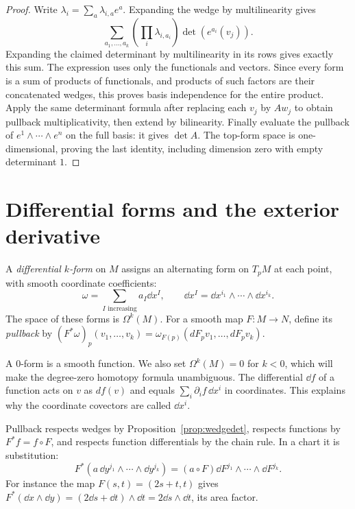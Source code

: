 \begin{proof}
Write $\lambda_i=\sum_a\lambda_{i,a}e^a$. Expanding the wedge by multilinearity gives
\[
\sum_{a_1,\ldots,a_k}\left(\prod_i\lambda_{i,a_i}\right)
\det(e^{a_i}(v_j)).
\]
Expanding the claimed determinant by multilinearity in its rows gives exactly this sum. The expression uses only the functionals and vectors. Since every form is a sum of products of functionals, and products of such factors are their concatenated wedges, this proves basis independence for the entire product. Apply the same determinant formula after replacing each $v_j$ by $Aw_j$ to obtain pullback multiplicativity, then extend by bilinearity. Finally evaluate the pullback of $e^1\wedge\cdots\wedge e^n$ on the full basis: it gives $\det A$. The top-form space is one-dimensional, proving the last identity, including dimension zero with empty determinant $1$.
\end{proof}

\section{Differential forms and the exterior derivative}

\begin{definition}
A \emph{differential $k$-form} on $M$ assigns an alternating form on $T_pM$ at each point, with smooth coordinate coefficients:
\[
\omega=\sum_{I\text{ increasing}}a_I\dd x^I,\qquad
\dd x^I=\dd x^{i_1}\wedge\cdots\wedge\dd x^{i_k}.
\]
The space of these forms is $\Omega^k(M)$. For a smooth map $F:M\to N$, define its \emph{pullback} by
$(F^*\omega)_p(v_1,\ldots,v_k)=\omega_{F(p)}(dF_pv_1,\ldots,dF_pv_k)$.
\end{definition}

A $0$-form is a smooth function. We also set $\Omega^k(M)=0$ for $k<0$, which will make the degree-zero homotopy formula unambiguous. The differential $\dd f$ of a function acts on $v$ as $df(v)$ and equals $\sum_i\partial_i f\,\dd x^i$ in coordinates. This explains why the coordinate covectors are called $\dd x^i$.

Pullback respects wedges by Proposition~\ref{prop:wedgedet}, respects functions by $F^*f=f\circ F$, and respects function differentials by the chain rule. In a chart it is substitution:
\[
F^*(a\,\dd y^{j_1}\wedge\cdots\wedge\dd y^{j_k})
=(a\circ F)\dd F^{j_1}\wedge\cdots\wedge\dd F^{j_k}.
\]
For instance the map $F(s,t)=(2s+t,t)$ gives $F^*(\dd x\wedge\dd y)=(2\dd s+\dd t)\wedge\dd t=2\dd s\wedge\dd t$, its area factor.

